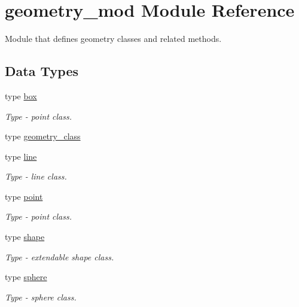 \hypertarget{namespacegeometry__mod}{}\section{geometry\+\_\+mod Module Reference}
\label{namespacegeometry__mod}


Module that defines geometry classes and related methods.  


\subsection*{Data Types}
\begin{DoxyCompactItemize}
\item 
type \mbox{\hyperlink{structgeometry__mod_1_1box}{box}}
\begin{DoxyCompactList}\small\item\em Type -\/ point class. \end{DoxyCompactList}\item 
type \mbox{\hyperlink{structgeometry__mod_1_1geometry__class}{geometry\+\_\+class}}
\item 
type \mbox{\hyperlink{structgeometry__mod_1_1line}{line}}
\begin{DoxyCompactList}\small\item\em Type -\/ line class. \end{DoxyCompactList}\item 
type \mbox{\hyperlink{structgeometry__mod_1_1point}{point}}
\begin{DoxyCompactList}\small\item\em Type -\/ point class. \end{DoxyCompactList}\item 
type \mbox{\hyperlink{structgeometry__mod_1_1shape}{shape}}
\begin{DoxyCompactList}\small\item\em Type -\/ extendable shape class. \end{DoxyCompactList}\item 
type \mbox{\hyperlink{structgeometry__mod_1_1sphere}{sphere}}
\begin{DoxyCompactList}\small\item\em Type -\/ sphere class. \end{DoxyCompactList}\end{DoxyCompactItemize}
